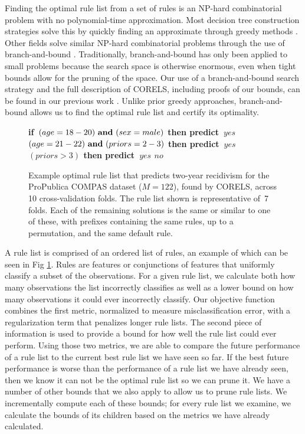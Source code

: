 \documentclass[format=sigconf]{acmart}
\def\bif{\bf if~}
\def\belif{{\bf else if~}}
\def\bthen{{\bf then predict~}}
\def\belse{{\bf else predict~}}
\def \band{{\bf ~and~}}
\begin{document}
Finding the optimal rule list from a set of rules is an NP-hard combinatorial problem with no polynomial-time approximation.
Most decision tree construction strategies solve this by quickly finding an approximate through greedy  methods \citep{BreimanFrOlSt84, Quinlan93}.
Other fields solve similar NP-hard combinatorial problems through the use of branch-and-bound \citep{Clausen99}.
Traditionally, branch-and-bound has only been applied to small problems because the search space is otherwise enormous, even when tight bounds allow for the pruning of the space.
Our use of a branch-and-bound search strategy and the full description of CORELS, including proofs of our bounds, can be found in our previous work \cite{AngelinoLaAlSeRu17}.
Unlike prior greedy approaches, branch-and-bound allows us to find the optimal rule list and certify its optimality.

\begin{figure}[ht!]
\vspace{2mm}
\begin{algorithmic}
\State \bif $(age = 18-20) \band (sex = male)$ \bthen $yes$
\State \belif $(age = 21-22) \band (priors = 2-3)$ \bthen $yes$
\State \belif $(priors > 3)$ \bthen $yes$
\State \belse $no$
\end{algorithmic}
\caption{Example optimal rule list that predicts two-year recidivism for the ProPublica COMPAS dataset (${M=122}$), found by CORELS, across 10 cross-validation folds.
%
The rule list shown is representative of~7 folds.
Each of the remaining solutions is the same or similar to one of these, with prefixes containing the same rules, up to a permutation, and the same default rule.
}
\label{fig:recidivism}
\end{figure}

A rule list is comprised of an ordered list of rules, an example of which can be seen in Fig \ref{fig:recidivism}.
Rules are features or conjunctions of features that uniformly classify a subset of the observations.
For a given rule list, we calculate both how many observations the list incorrectly classifies as well as a lower bound on how many observations it could ever incorrectly classify.
Our objective function combines the first metric, normalized to measure misclassification error, with a regularization term that penalizes longer rule lists.
The second piece of information is used to provide a bound for how well the rule list could ever perform.
Using those two metrics, we are able to compare the future performance of a rule list to the current best rule list we have seen so far.
If the best future performance is worse than the performance of a rule list we have already seen, then we know it can not be the optimal rule list so we can prune it.
We have a number of other bounds that we also apply to allow us to prune rule lists.
We incrementally compute each of these bounds; for every rule list we examine, we calculate the bounds of its children based on the metrics we have already calculated.
\end{document}
